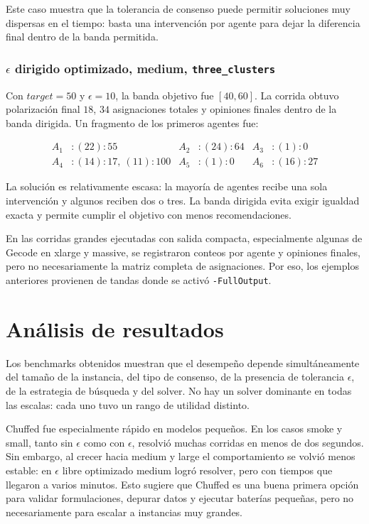 \documentclass[10pt,letterpaper]{article}
\begin{document}
Este caso muestra que la tolerancia de consenso puede permitir soluciones muy dispersas en el tiempo: basta una intervenci\'on por agente para dejar la diferencia final dentro de la banda permitida.

\subsubsection{\(\epsilon\) dirigido optimizado, medium, \texttt{three\_clusters}}

Con \(target=50\) y \(\epsilon=10\), la banda objetivo fue \([40,60]\). La corrida obtuvo polarizaci\'on final \(18\), \(34\) asignaciones totales y opiniones finales dentro de la banda dirigida. Un fragmento de los primeros agentes fue:

\[
\begin{aligned}
A_1 &: (22):55 &
A_2 &: (24):64 &
A_3 &: (1):0 \\
A_4 &: (14):17,\ (11):100 &
A_5 &: (1):0 &
A_6 &: (16):27
\end{aligned}
\]

La soluci\'on es relativamente escasa: la mayor\'ia de agentes recibe una sola intervenci\'on y algunos reciben dos o tres. La banda dirigida evita exigir igualdad exacta y permite cumplir el objetivo con menos recomendaciones.

En las corridas grandes ejecutadas con salida compacta, especialmente algunas de Gecode en xlarge y massive, se registraron conteos por agente y opiniones finales, pero no necesariamente la matriz completa de asignaciones. Por eso, los ejemplos anteriores provienen de tandas donde se activ\'o \texttt{-FullOutput}.

\section{An\'alisis de resultados}

Los benchmarks obtenidos muestran que el desempe\~no depende simult\'aneamente del tama\~no de la instancia, del tipo de consenso, de la presencia de tolerancia \(\epsilon\), de la estrategia de b\'usqueda y del solver. No hay un solver dominante en todas las escalas: cada uno tuvo un rango de utilidad distinto.

Chuffed fue especialmente r\'apido en modelos peque\~nos. En los casos smoke y small, tanto sin \(\epsilon\) como con \(\epsilon\), resolvi\'o muchas corridas en menos de dos segundos. Sin embargo, al crecer hacia medium y large el comportamiento se volvi\'o menos estable: en \(\epsilon\) libre optimizado medium logr\'o resolver, pero con tiempos que llegaron a varios minutos. Esto sugiere que Chuffed es una buena primera opci\'on para validar formulaciones, depurar datos y ejecutar bater\'ias peque\~nas, pero no necesariamente para escalar a instancias muy grandes.
\end{document}
